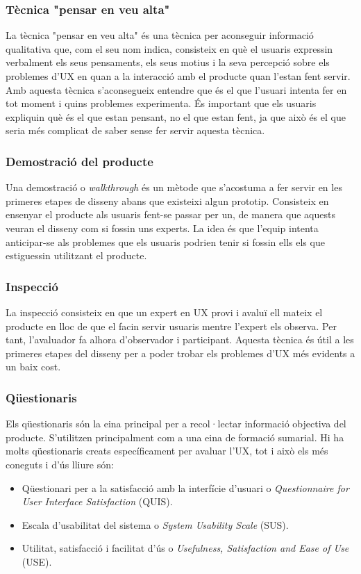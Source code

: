 \subsubsection{Tècnica "pensar en veu alta"}
La tècnica "pensar en veu alta" és una tècnica per aconseguir informació qualitativa que, com el seu nom indica, consisteix en què el usuaris expressin verbalment els seus pensaments, els seus motius i la seva percepció sobre els problemes d'\ac{UX} en quan a la interacció amb el producte quan l'estan fent servir. Amb aquesta tècnica s'aconsegueix entendre que és el que l'usuari intenta fer en tot moment i quins problemes experimenta.
És important que els usuaris expliquin què és el que estan pensant, no el que estan fent, ja que això és el que seria més complicat de saber sense fer servir aquesta tècnica.  
\subsubsection{Demostració del producte}
Una demostració o \textit{walkthrough} és un mètode que s'acostuma a fer servir en les primeres etapes de disseny abans que existeixi algun prototip. Consisteix en ensenyar el producte als usuaris fent-se passar per un, de manera que aquests veuran el disseny com si fossin uns experts. La idea és que l'equip intenta anticipar-se als problemes que els usuaris podrien tenir si fossin ells els que estiguessin utilitzant el producte. 
\subsubsection{Inspecció} 
La inspecció consisteix en que un expert en UX provi i avaluï ell mateix el producte en lloc de que el facin servir usuaris mentre l'expert els observa. Per tant, l'avaluador fa alhora d'observador i participant. Aquesta tècnica és útil a les primeres etapes del disseny per a poder trobar els problemes d'\ac{UX} més evidents a un baix cost. 
\subsubsection{Qüestionaris}
Els qüestionaris són la eina principal per a recol·lectar informació objectiva del producte. S'utilitzen principalment com a una eina de formació sumarial. Hi ha molts qüestionaris creats específicament per avaluar l'\ac{UX}, tot i això els més coneguts i d'ús lliure són:
\begin{itemize}
\item Qüestionari per a la satisfacció amb la interfície d'usuari o \textit{Questionnaire for User Interface Satisfaction} (QUIS).
\item Escala d'usabilitat del sistema o \textit{System Usability Scale} (\gls{SUS}).
\item Utilitat, satisfacció i facilitat d'ús o \textit{Usefulness, Satisfaction and Ease of Use} (\gls{USE}).
\end{itemize}

